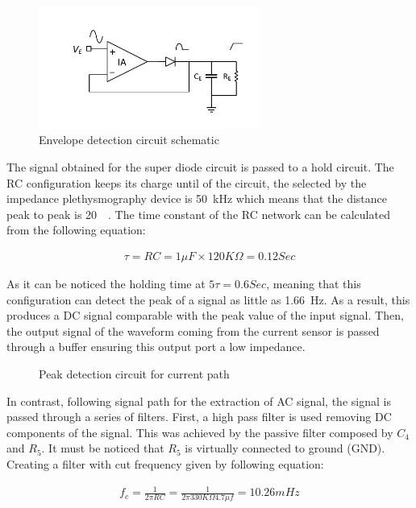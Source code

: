 \begin{figure}[!htpb]
	\centering
	\includegraphics[width=7.3cm,keepaspectratio]{figure5}
 	\caption{Envelope detection circuit schematic}
    \label{fig:envelope}
\end{figure}

The signal obtained for the super diode circuit is passed to a hold circuit. The RC configuration keeps its charge until of the circuit, the selected by the impedance plethysmography device is \SI{50}{\kHz} which means that the distance peak to peak is \SI{20}{\micro\sec}. The time constant of the RC network can be calculated from the following equation:

\begin{align}
\tau = RC = 1 \mu F \times 120K\Omega = 0.12 Sec
\end{align}

As it can be noticed the holding time at $5\tau = 0.6 Sec$, meaning that this configuration can detect the peak of a signal as little as \SI{1.66}{\hertz}. As a result, this produces a DC signal comparable with the peak value of the input signal. Then, the output signal of the waveform coming from the current sensor is passed through a buffer ensuring this output port a low impedance. 

\begin{figure}
     \label{fig:peak}
    \caption{Peak detection circuit for current path}
\end{figure}

In contrast, following signal path for the extraction of AC signal, the signal is passed through a series of filters. First, a high pass filter is used removing DC components of the signal. This was achieved by the passive filter composed by $C_4$ and $R_5$. It must be noticed that $R_5$ is virtually connected to ground (GND). Creating a filter with cut frequency given by following equation:  

\begin{align}
\label{eg:fc1}
f_c = \frac{1}{2 \pi R C} = \frac{1}{2 \pi 330K\Omega 4.7\mu f}=10.26 mHz
\end{align}

